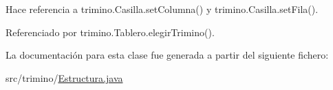 Hace referencia a trimino.\+Casilla.\+set\+Columna() y trimino.\+Casilla.\+set\+Fila().



Referenciado por trimino.\+Tablero.\+elegir\+Trimino().



La documentación para esta clase fue generada a partir del siguiente fichero\+:\begin{DoxyCompactItemize}
\item 
src/trimino/\mbox{\hyperlink{Estructura_8java}{Estructura.\+java}}\end{DoxyCompactItemize}

